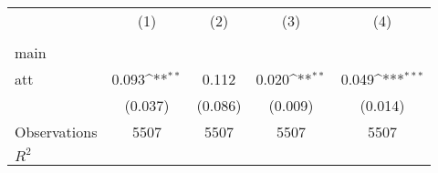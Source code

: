 {
\def\sym#1{\ifmmode^{#1}\else\(^{#1}\)\fi}
\begin{tabular}{l*{4}{c}}
\hline\hline
                    &\multicolumn{1}{c}{(1)}&\multicolumn{1}{c}{(2)}&\multicolumn{1}{c}{(3)}&\multicolumn{1}{c}{(4)}\\
                    &\multicolumn{1}{c}{} &\multicolumn{1}{c}{} &\multicolumn{1}{c}{} &\multicolumn{1}{c}{} \\
\hline
main                &                     &                     &                     &                     \\
att                 &       0.093\sym{**} &       0.112         &       0.020\sym{**} &       0.049\sym{***}\\
                    &     (0.037)         &     (0.086)         &     (0.009)         &     (0.014)         \\
\hline
Observations        &        5507         &        5507         &        5507         &        5507         \\
\(R^{2}\)           &                     &                     &                     &                     \\
\hline\hline
\end{tabular}
}
